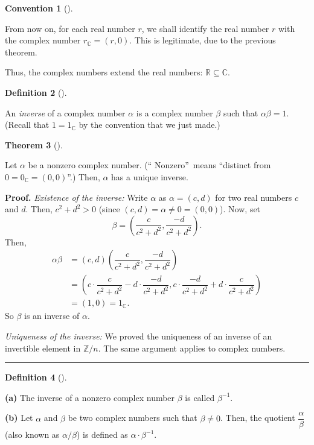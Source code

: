 \documentclass[numbers=enddot,12pt,final,onecolumn,notitlepage]{scrartcl}%
\numberwithin{exer}{subsection}
\theoremstyle{definition}
\newtheorem{theo}{Theorem}[subsection]
\newenvironment{theorem}[1][]
{\begin{theo}[#1]\begin{leftbar}}
{\end{leftbar}\end{theo}}
\newtheorem{defi}[theo]{Definition}
\newenvironment{definition}[1][]
{\begin{defi}[#1]\begin{leftbar}}
{\end{leftbar}\end{defi}}
\newtheorem{conv}[theo]{Convention}
\newenvironment{convention}[1][]
{\begin{conv}[#1]\begin{leftbar}}
{\end{leftbar}\end{conv}}
\newenvironment{proof}[1][Proof]{\noindent\textbf{#1.} }{\ \rule{0.5em}{0.5em}}
\begin{document}
\begin{convention}
From now on, for each real number $r$, we shall identify the real number $r$
with the complex number $r_{\mathbb{C}}=\left(  r,0\right)  $. This is
legitimate, due to the previous theorem.
\end{convention}

Thus, the complex numbers extend the real numbers: $\mathbb{R}\subseteq
\mathbb{C}$.

\begin{definition}
An \textit{inverse} of a complex number $\alpha$ is a complex number $\beta$
such that $\alpha\beta=1$. (Recall that $1=1_{\mathbb{C}}$ by the convention
that we just made.)
\end{definition}

\begin{theorem}
Let $\alpha$ be a nonzero complex number. (\textquotedblleft
Nonzero\textquotedblright\ means \textquotedblleft distinct from
$0=0_{\mathbb{C}}=\left(  0,0\right)  $\textquotedblright.) Then, $\alpha$ has
a unique inverse.
\end{theorem}

\begin{proof}
\textit{Existence of the inverse:} Write $\alpha$ as $\alpha=\left(
c,d\right)  $ for two real numbers $c$ and $d$. Then, $c^{2}+d^{2}>0$ (since
$\left(  c,d\right)  =\alpha\neq0=\left(  0,0\right)  $). Now, set%
\[
\beta=\left(  \dfrac{c}{c^{2}+d^{2}},\dfrac{-d}{c^{2}+d^{2}}\right)  .
\]
Then,%
\begin{align*}
\alpha\beta &  =\left(  c,d\right)  \left(  \dfrac{c}{c^{2}+d^{2}},\dfrac
{-d}{c^{2}+d^{2}}\right) \\
&  =\left(  c\cdot\dfrac{c}{c^{2}+d^{2}}-d\cdot\dfrac{-d}{c^{2}+d^{2}}%
,c\cdot\dfrac{-d}{c^{2}+d^{2}}+d\cdot\dfrac{c}{c^{2}+d^{2}}\right) \\
&  =\left(  1,0\right)  =1_{\mathbb{C}}.
\end{align*}
So $\beta$ is an inverse of $\alpha$.

\textit{Uniqueness of the inverse:} We proved the uniqueness of an inverse of
an invertible element in $\mathbb{Z}/n$. The same argument applies to complex numbers.
\end{proof}

\begin{definition}
\textbf{(a)} The inverse of a nonzero complex number $\beta$ is called
$\beta^{-1}$.

\textbf{(b)} Let $\alpha$ and $\beta$ be two complex numbers such that
$\beta\neq0$. Then, the quotient $\dfrac{\alpha}{\beta}$ (also known as
$\alpha/\beta$) is defined as $\alpha\cdot\beta^{-1}$.
\end{definition}
\end{document}
